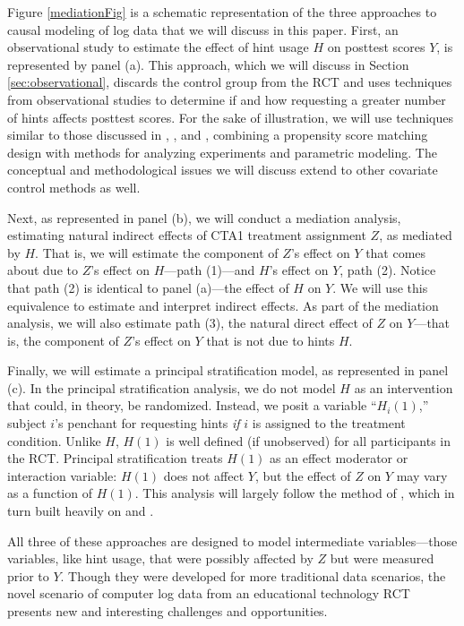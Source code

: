 \documentclass{article}\usepackage[]{graphicx}\usepackage[]{color}
\begin{document}
Figure \ref{mediationFig} is a schematic representation of the three
approaches to causal modeling of log data that we will discuss in this
paper.
First, an observational study to estimate the effect of hint usage $H$
on posttest scores $Y$, is represented by panel (a).
This approach, which we will discuss in Section
\ref{sec:observational}, discards the control group from the RCT and
uses techniques from observational studies to determine if and how requesting
a greater number of hints affects posttest scores.
For the sake of illustration, we will use techniques similar to those
discussed in \citet{rosenbaum2002observational},
 \citet{hansen2009b}, and \citet{ho:etal:2007}, combining a propensity
 score matching design with methods for analyzing experiments and
 parametric modeling.
The conceptual and methodological issues we will discuss extend to
other covariate control methods as well.

Next, as represented in panel (b), we will conduct a mediation
analysis, estimating natural
indirect effects of CTA1 treatment assignment $Z$, as mediated by
$H$. That is, we will estimate the component of $Z$'s effect on $Y$ that comes about
due to $Z$'s effect on $H$---path (1)---and $H$'s effect on $Y$, path
(2).
Notice that path (2) is identical to panel (a)---the effect of $H$ on
$Y$.
We will use this equivalence to estimate and interpret indirect
effects.
As part of the mediation analysis, we will also estimate path (3), the
natural direct effect of $Z$ on $Y$---that is, the component of $Z$'s
effect on $Y$ that is not due to hints $H$.

Finally, we will estimate a principal stratification model, as represented in panel
(c).
In the principal stratification analysis, we do not model $H$ as an
intervention that could, in theory, be randomized.
Instead, we posit a variable ``$H_i(1)$,''  subject $i$'s penchant for
requesting hints \emph{if} $i$ is assigned to the treatment
condition.
Unlike $H$, $H(1)$ is well defined (if
unobserved) for all participants in the RCT.
Principal stratification treats $H(1)$ as an effect moderator or
interaction variable: $H(1)$ does not affect $Y$, but the effect of
$Z$ on $Y$ may vary as a function of $H(1)$.
This analysis will largely follow the method of \citet{aoas}, which in
turn built heavily on \citet{schwartz2011bayesian} and
\citet{jin2008principal}.

All three of these approaches are designed to model intermediate
variables---those variables, like hint usage,
that were possibly affected by $Z$ but were measured prior to $Y$.
Though they were developed for more traditional data scenarios, the
novel scenario of computer log data from an educational technology RCT
presents new and interesting challenges and opportunities.
\end{document}

